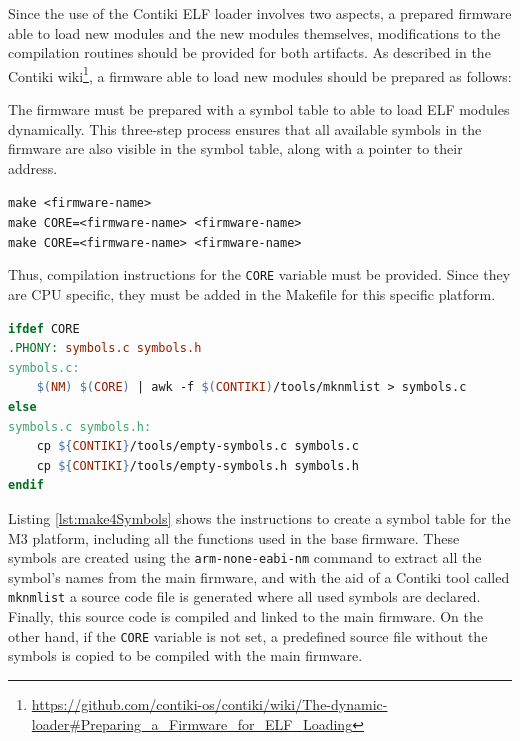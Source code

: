 Since the use of the Contiki ELF loader involves two aspects, a prepared firmware able to load new modules and the new modules themselves, modifications to the compilation routines should be provided for both artifacts.
As described in the Contiki wiki\footnote{\url{https://github.com/contiki-os/contiki/wiki/The-dynamic-loader\#Preparing_a_Firmware_for_ELF_Loading}}, a firmware able to load new modules should be prepared as follows:
\begin{citeverbatim}
	The firmware must be prepared with a symbol table to able to load ELF modules dynamically.
	This three-step process ensures that all available symbols in the firmware are also visible in the symbol table, along with a pointer to their address.
	
	\texttt{make <firmware-name>} \\
	\texttt{make CORE=<firmware-name> <firmware-name>} \\
	\texttt{make CORE=<firmware-name> <firmware-name>} \\
\end{citeverbatim}
Thus, compilation instructions for the \texttt{CORE} variable must be provided.
Since they are CPU specific, they must be added in the Makefile for this specific platform.
\\
\begin{lstlisting}[language=make, caption=Compilation settings to create a proper symbol table, label=lst:make4Symbols]
ifdef CORE
.PHONY: symbols.c symbols.h
symbols.c:
	$(NM) $(CORE) | awk -f $(CONTIKI)/tools/mknmlist > symbols.c
else
symbols.c symbols.h:
	cp ${CONTIKI}/tools/empty-symbols.c symbols.c
	cp ${CONTIKI}/tools/empty-symbols.h symbols.h
endif
\end{lstlisting}

Listing \ref{lst:make4Symbols} shows the instructions to create a symbol table for the M3 platform, including all the functions used in the base firmware.
These symbols are created using the \texttt{arm-none-eabi-nm} command to extract all the symbol's names from the main firmware, and with the aid of a Contiki tool called \texttt{mknmlist} a source code file is generated where all used symbols are declared.
Finally, this source code is compiled and linked to the main firmware.
On the other hand, if the \texttt{CORE} variable is not set, a predefined source file without the symbols is copied to be compiled with the main firmware.

